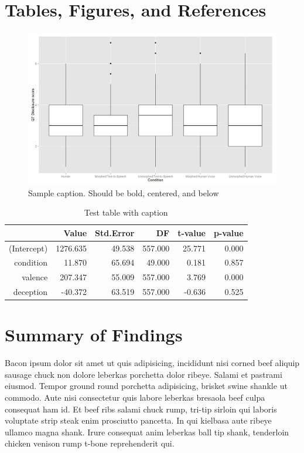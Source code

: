 \documentclass{icisdoc}
\begin{document}
\chapter{Tables, Figures, and References}

\begin{figure}[h]
  \centering
  \includegraphics[scale = 0.45]{testimage.png}
  \caption{Sample caption. Should be bold, centered, and below} 
  \label{fig:test}
\end{figure}

\begin{table}[ht]
\centering
\begin{tabular}{rrrrrr}
  \hline
 & Value & Std.Error & DF & t-value & p-value \\ 
  \hline
(Intercept) & 1276.635 & 49.538 & 557.000 & 25.771 & 0.000 \\ 
  condition & 11.870 & 65.694 & 49.000 & 0.181 & 0.857 \\ 
  valence & 207.347 & 55.009 & 557.000 & 3.769 & 0.000 \\ 
  deception & -40.372 & 63.519 & 557.000 & -0.636 & 0.525 \\ 
   \hline
\end{tabular}
\caption{Test table with caption} 
\label{tab:lme-mean}
\end{table}





\chapter{Summary of Findings}
Bacon ipsum dolor sit amet ut quis adipisicing, incididunt nisi corned beef
aliquip sausage chuck non dolore leberkas porchetta dolor ribeye. Salami et
pastrami eiusmod. Tempor ground round porchetta adipisicing, brisket swine
shankle ut commodo. Aute nisi consectetur quis labore leberkas bresaola beef
culpa consequat ham id. Et beef ribs salami chuck rump, tri-tip sirloin qui
laboris voluptate strip steak enim prosciutto pancetta. In qui kielbasa aute
ribeye ullamco magna shank. Irure consequat anim leberkas ball tip shank,
tenderloin chicken venison rump t-bone reprehenderit qui.
\end{document}
